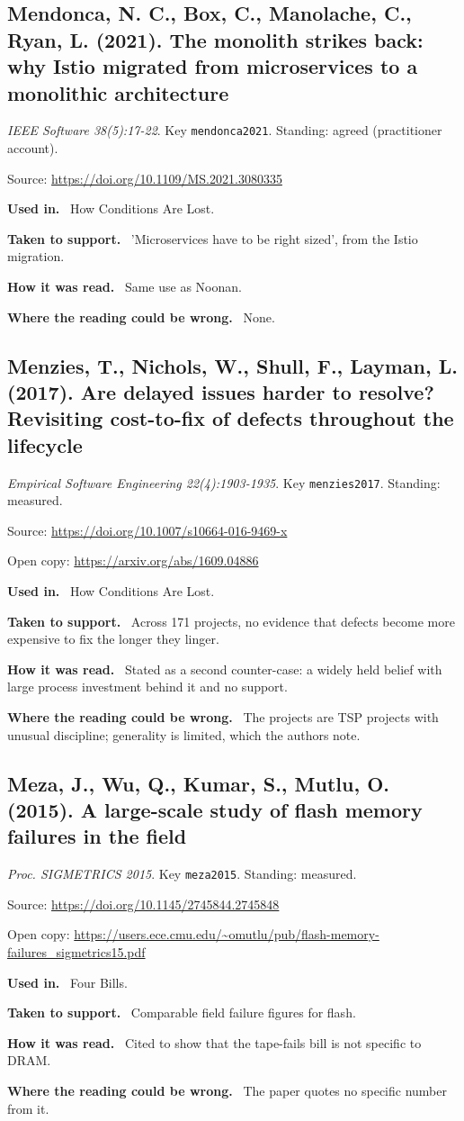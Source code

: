 \documentclass[11pt,oneside]{article}
\newcommand{\field}[1]{\par\noindent\textbf{\color{accent}#1.}\ }
\begin{document}
\hypertarget{src:mendonca2021}{}
\subsection*{Mendonca, N. C., Box, C., Manolache, C., Ryan, L. (2021). The monolith strikes back: why Istio migrated from microservices to a monolithic architecture}
\noindent\small\emph{IEEE Software 38(5):17-22}. Key \texttt{mendonca2021}. Standing: agreed (practitioner account).
\par\noindent\small Source: \url{https://doi.org/10.1109/MS.2021.3080335}
\normalsize
\field{Used in} How Conditions Are Lost.
\field{Taken to support} 'Microservices have to be right sized', from the Istio migration.
\field{How it was read} Same use as Noonan.
\field{Where the reading could be wrong} None.

\hypertarget{src:menzies2017}{}
\subsection*{Menzies, T., Nichols, W., Shull, F., Layman, L. (2017). Are delayed issues harder to resolve? Revisiting cost-to-fix of defects throughout the lifecycle}
\noindent\small\emph{Empirical Software Engineering 22(4):1903-1935}. Key \texttt{menzies2017}. Standing: measured.
\par\noindent\small Source: \url{https://doi.org/10.1007/s10664-016-9469-x}
\par\noindent\small Open copy: \url{https://arxiv.org/abs/1609.04886}
\normalsize
\field{Used in} How Conditions Are Lost.
\field{Taken to support} Across 171 projects, no evidence that defects become more expensive to fix the longer they linger.
\field{How it was read} Stated as a second counter-case: a widely held belief with large process investment behind it and no support.
\field{Where the reading could be wrong} The projects are TSP projects with unusual discipline; generality is limited, which the authors note.

\hypertarget{src:meza2015}{}
\subsection*{Meza, J., Wu, Q., Kumar, S., Mutlu, O. (2015). A large-scale study of flash memory failures in the field}
\noindent\small\emph{Proc. SIGMETRICS 2015}. Key \texttt{meza2015}. Standing: measured.
\par\noindent\small Source: \url{https://doi.org/10.1145/2745844.2745848}
\par\noindent\small Open copy: \url{https://users.ece.cmu.edu/~omutlu/pub/flash-memory-failures_sigmetrics15.pdf}
\normalsize
\field{Used in} Four Bills.
\field{Taken to support} Comparable field failure figures for flash.
\field{How it was read} Cited to show that the tape-fails bill is not specific to DRAM.
\field{Where the reading could be wrong} The paper quotes no specific number from it.
\end{document}

